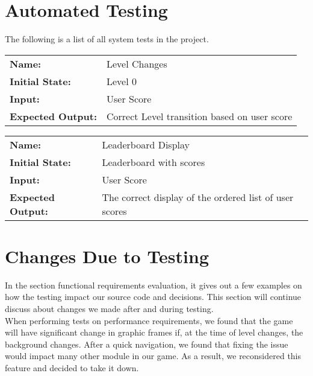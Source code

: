 \documentclass[12pt, titlepage]{article}
\begin{document}
\section{Automated Testing}

The following is a list of all system tests in the project.

\begin{center}

\begin{longtable}{ l | p{10cm} }
	\hline
	\rule{0pt}{1.5em}\textbf{Name:} & Level Changes\\
	\textbf{Initial State:} & Level 0\\
	\textbf{Input:} & User Score\\
	\textbf{Expected Output:} & Correct Level transition based on user score\\[0.6em]
\end{longtable}

\begin{longtable}{ l | p{10cm} }
	\hline
	\rule{0pt}{1.5em}\textbf{Name:} & Leaderboard Display\\
	\textbf{Initial State:} & Leaderboard with scores\\
	\textbf{Input:} & User Score\\
	\textbf{Expected Output:} & The correct display of the ordered list of user scores\\[0.6em]
\end{longtable}

\end{center}






\section{Changes Due to Testing}
 In the section functional requirements evaluation, it gives out a few examples on how the testing impact our source code and decisions. This section will continue discuss about changes we made after and during testing.\\
 When performing tests on performance requirements, we found that the game will have significant change in graphic frames if, at the time of level changes, the background changes. After a quick navigation, we found that fixing the issue would impact many other module in our game. As a result, we reconsidered this feature and decided to take it down.
 
\end{document}
